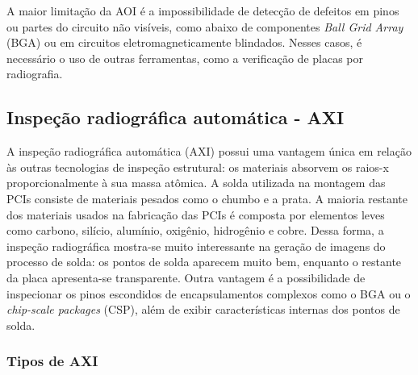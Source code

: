 
A maior limitação da AOI é a impossibilidade de detecção de defeitos em pinos ou partes do circuito não visíveis, como abaixo de componentes \textit{Ball Grid Array} (BGA) ou em circuitos eletromagneticamente blindados. Nesses casos, é necessário o uso de outras ferramentas, como a verificação de placas por radiografia.
\subsection{Inspeção radiográfica automática - AXI}

A inspeção radiográfica automática (AXI) possui uma vantagem única em relação às outras tecnologias de inspeção estrutural: os materiais absorvem os raios-x proporcionalmente à sua massa atômica. A solda utilizada na montagem das PCIs consiste de materiais pesados como o chumbo e a prata. A maioria restante dos materiais usados na fabricação das PCIs é composta por elementos leves como carbono, silício, alumínio, oxigênio, hidrogênio e cobre. Dessa forma, a inspeção radiográfica mostra-se muito interessante na geração de imagens do processo de solda: os pontos de solda aparecem muito bem, enquanto o restante da placa apresenta-se transparente. Outra vantagem é a possibilidade de inspecionar os pinos escondidos de encapsulamentos complexos como o BGA ou o \textit{chip-scale packages} (CSP), além de exibir características internas dos pontos de solda.

\subsubsection{Tipos de AXI}


